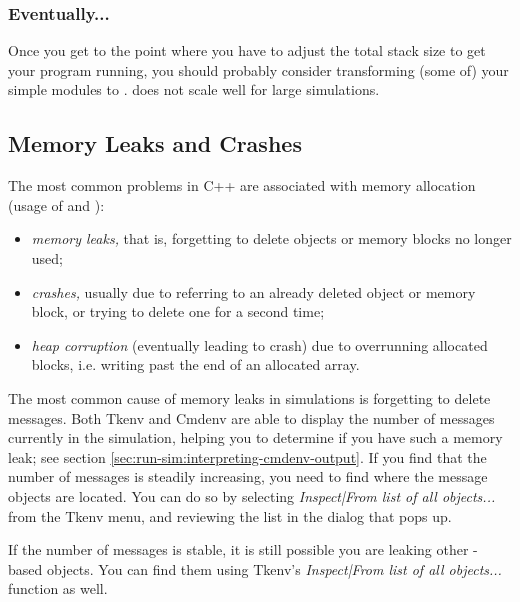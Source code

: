 \subsubsection{Eventually...}
\label{sec:run-sim:eventually-about-activity}

Once you get to the point where you have to adjust the total stack size to
get your program running, you should probably consider transforming (some
of) your  simple modules to .
 does not scale well for large simulations.



\subsection{Memory Leaks and Crashes}
\label{sec:run-sim:memory-leaks-and-crashes}

The most common problems in C++ are associated with memory allocation
(usage of  and ):

\begin{itemize}
   \item{\textit{memory leaks,} that is, forgetting to delete objects
     or memory blocks no longer used;}
   \item{\textit{crashes,} usually due to referring to an already deleted
     object or memory block, or trying to delete one for a second time;}
   \item{\textit{heap corruption} (eventually leading to crash) due to
     overrunning allocated blocks, i.e. writing past the end of an allocated
     array.}
\end{itemize}

The most common cause of memory leaks in {\opp} simulations is
forgetting to delete messages. Both Tkenv and Cmdenv are able
to display the number of messages currently in the simulation,
helping you to determine if you have such a memory leak;
see section \ref{sec:run-sim:interpreting-cmdenv-output}.
If you find that the number of messages is steadily increasing,
you need to find where the message objects are located. You can do so
by selecting \textit{Inspect|From list of all objects...} from
the Tkenv menu, and reviewing the list in the dialog that pops up.

If the number of messages is stable, it is still possible
you are leaking other -based objects. You can
find them using Tkenv's \textit{Inspect|From list of all objects...}
function as well.

